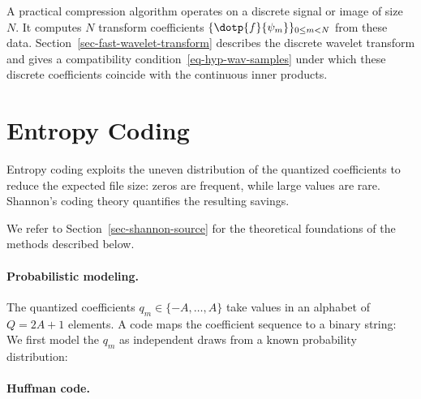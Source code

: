 A practical compression algorithm operates on a discrete signal or image of size $N$. It computes $N$ transform coefficients $\{\dotp{f}{\psi_m}\}_{0\leq m<N}$ from these data. Section~\ref{sec-fast-wavelet-transform} describes the discrete wavelet transform and gives a compatibility condition~\eqref{eq-hyp-wav-samples} under which these discrete coefficients coincide with the continuous inner products.





                                                                 
\section{Entropy Coding}
\label{subsec-entropic-coding}

Entropy coding exploits the uneven distribution of the quantized coefficients to reduce the expected file size: zeros are frequent, while large values are rare. Shannon's coding theory \cite{shannon-information} quantifies the resulting savings.

We refer to Section~\ref{sec-shannon-source} for the theoretical foundations of the methods described below.


  
\paragraph{Probabilistic modeling.}

The quantized coefficients $q_m \in \{-A,\ldots,A\}$ take values in an alphabet of $Q=2A+1$ elements.
A code maps the coefficient sequence to a binary string:
We first model the $q_m$ as independent draws from a known probability distribution:

  
\paragraph{Huffman code.}

